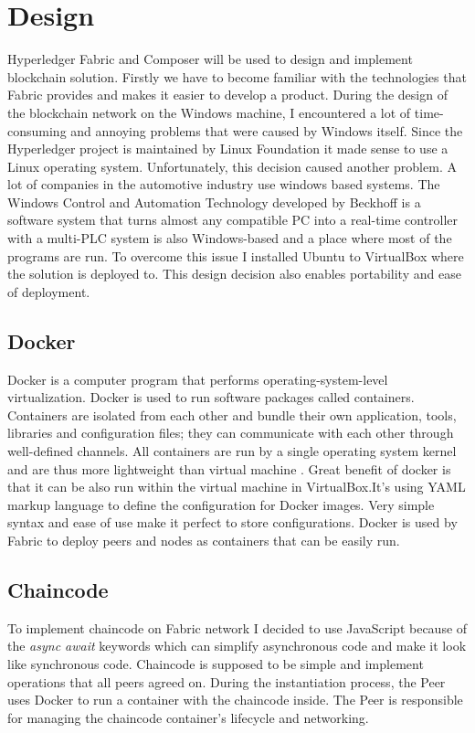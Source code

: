 \chapter{Design}

Hyperledger Fabric and Composer will be used to design and implement blockchain solution. Firstly we have to become familiar with the technologies that Fabric provides and makes it easier to develop a product. 
During the design of the blockchain network on the Windows machine, I encountered a lot of time-consuming and annoying problems that were caused by Windows itself. Since the Hyperledger project is maintained by Linux Foundation it made sense to use a Linux operating system. Unfortunately, this decision caused another problem. A lot of companies in the automotive industry use windows based systems. The Windows Control and Automation Technology developed by Beckhoff is a software system that turns almost any compatible PC into a real-time controller with a multi-PLC system is also Windows-based and a place where most of the programs are run. To overcome this issue I installed Ubuntu to VirtualBox where the solution is deployed to. This design decision also enables portability and ease of deployment.

\section{Docker}
Docker is a computer program that performs operating-system-level virtualization. Docker is used to run software packages called containers. Containers are isolated from each other and bundle their own application, tools, libraries and configuration files; they can communicate with each other through well-defined channels. All containers are run by a single operating system kernel and are thus more lightweight than virtual machine \cite{docker}. Great benefit of docker is that it can be also run within the virtual machine in VirtualBox.It's using YAML markup language to define the configuration for Docker images. Very simple syntax and ease of use make it perfect to store configurations. Docker is used by Fabric to deploy peers and nodes as containers that can be easily run.

\section{Chaincode}
To implement chaincode on Fabric network I decided to use JavaScript because of the \emph{async await} keywords which can simplify asynchronous code and make it look like synchronous code. Chaincode is supposed to be simple and implement operations that all peers agreed on. During the instantiation process, the Peer uses Docker to run a container with the chaincode inside. The Peer is responsible for managing the chaincode container’s lifecycle and networking.



